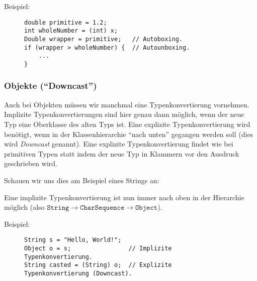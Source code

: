 			Beispiel:
			\begin{figure}[H]
				\centering
				\begin{lstlisting}
double primitive = 1.2;
int wholeNumber = (int) x;
Double wrapper = primitive;   // Autoboxing.
if (wrapper > wholeNumber) {  // Autounboxing.
	...
}
\end{lstlisting}
			\end{figure}
		
	
	\subsubsection{Objekte (\enquote{Downcast})}
		\label{sec:downcast}
	
		Auch bei Objekten müssen wir manchmal eine Typenkonvertierung vornehmen. Implizite Typenkonvertierungen sind hier genau dann möglich, wenn der neue Typ eine Oberklasse des alten Typs ist. Eine explizite Typenkonvertierung wird benötigt, wenn in der Klassenhierarchie \enquote{nach unten} gegangen werden soll (dies wird \textit{Downcast} genannt). Eine explizite Typenkonvertierung findet wie bei primitiven Typen statt indem der neue Typ in Klammern vor den Ausdruck geschrieben wird.
		
		Schauen wir uns dies am Beispiel eines Strings an:
		\begin{figure}[H]
			\centering
		\end{figure}
		Eine implizite Typenkonvertierung ist nun immer nach oben in der Hierarchie möglich (also \( \texttt{String} \rightarrow \texttt{CharSequence} \rightarrow \texttt{Object} \)).
		
		Beispiel:
		\begin{figure}[H]
			\centering
			\begin{lstlisting}
String s = "Hello, World!";
Object o = s;                // Implizite Typenkonvertierung.
String casted = (String) o;  // Explizite Typenkonvertierung (Downcast).
\end{lstlisting}
		\end{figure}


